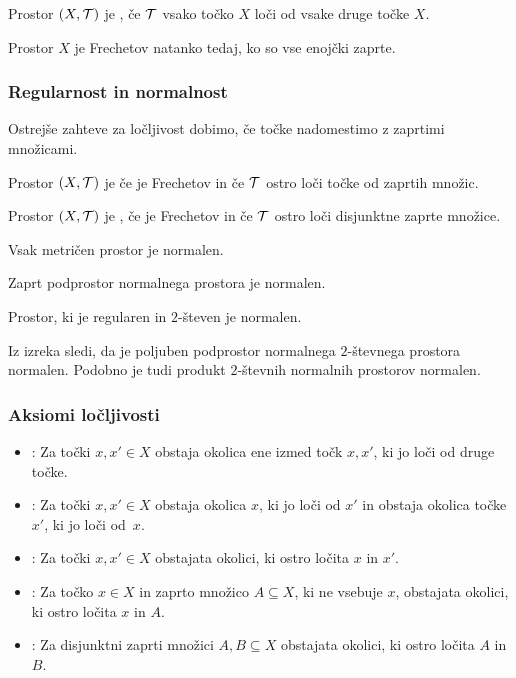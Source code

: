 \begin{definicija}
    Prostor $(X, \mathcal{T})$ je , če $\mathcal{T}$ vsako točko $X$ loči od vsake druge točke $X$.
\end{definicija}

\begin{trditev}
    Prostor $X$ je Frechetov natanko tedaj, ko so vse enojčki zaprte.
\end{trditev}

\subsubsection{Regularnost in normalnost}
Ostrejše zahteve za ločljivost dobimo, če točke nadomestimo z zaprtimi množicami.
\begin{definicija}
    Prostor $(X, \mathcal{T})$ je  če je Frechetov in če $\mathcal{T}$ ostro loči točke od zaprtih množic.
\end{definicija}

\begin{definicija}
    Prostor $(X, \mathcal{T})$ je , če je Frechetov in če $\mathcal{T}$ ostro loči disjunktne zaprte množice.
\end{definicija}

\begin{trditev}
    Vsak metričen prostor je normalen.
\end{trditev}

\begin{trditev}
    Zaprt podprostor normalnega prostora je normalen. 
\end{trditev}

\begin{izrek}
    Prostor, ki je regularen in $2$-števen je normalen.
\end{izrek}

\begin{opomba}
    Iz izreka sledi, da je poljuben podprostor normalnega $2$-števnega prostora normalen. Podobno je tudi produkt $2$-števnih normalnih prostorov normalen.
\end{opomba}

\subsubsection{Aksiomi ločljivosti}
\begin{itemize}
    \item [] : Za točki $x, x' \in X$ obstaja okolica ene izmed točk $x, x'$, ki jo loči od druge točke.
    \item [] : Za točki $x, x' \in X$ obstaja okolica $x$, ki jo loči od $x'$ in obstaja okolica točke $x'$, ki jo loči od~$x$.
    \item [] : Za točki $x, x' \in X$ obstajata okolici, ki ostro ločita $x$ in $x'$.
    \item [] : Za točko $x \in X$ in zaprto množico $A \subseteq X$, ki ne vsebuje $x$, obstajata okolici, ki ostro ločita $x$ in $A$.
    \item [] : Za disjunktni zaprti množici $A, B \subseteq X$ obstajata okolici, ki ostro ločita $A$ in $B$.
\end{itemize}

